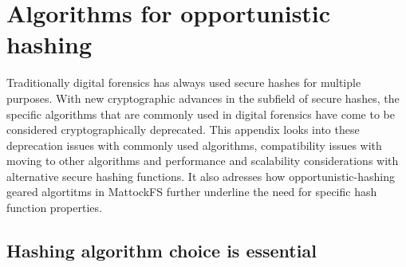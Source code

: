 \chapter{Algorithms for opportunistic hashing}
Traditionally digital forensics has always used secure hashes for multiple purposes. With new cryptographic advances in the subfield of secure hashes, the specific algorithms that are commonly used in digital forensics have come to be considered cryptographically deprecated. This appendix looks into these deprecation issues with commonly used algorithms, compatibility issues with moving to other algorithms and performance and scalability considerations with alternative secure hashing functions.
It also adresses how opportunistic-hashing geared algortitms in MattockFS further underline the need for specific hash function properties. 
\section{Hashing algorithm choice is essential} 
